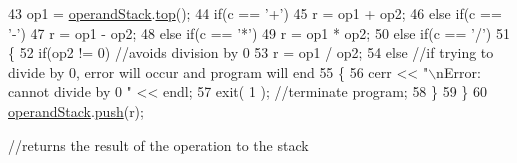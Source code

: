 \begin{DoxyCode}
{          }
43                op1 = \hyperlink{classAlgebraicExpression_a8f0ee1ac59e782a546a7de47e507b391}{operandStack}.\hyperlink{classStack_ad461f6de40c8672dbf743068f4515061}{top}();
44                \textcolor{keywordflow}{if}(c == \textcolor{charliteral}{'+'})
45                   r = op1 + op2;
46                \textcolor{keywordflow}{else} \textcolor{keywordflow}{if}(c == \textcolor{charliteral}{'-'})
47                   r = op1 - op2;
48                \textcolor{keywordflow}{else} \textcolor{keywordflow}{if}(c == \textcolor{charliteral}{'*'})
49                   r = op1 * op2;
50                \textcolor{keywordflow}{else} \textcolor{keywordflow}{if}(c == \textcolor{charliteral}{'/'})
51                \{
52                   \textcolor{keywordflow}{if}(op2 != 0) \textcolor{comment}{//avoids division by 0                                                      
                                                                                                       }
53                      r = op1 / op2;
54                   \textcolor{keywordflow}{else} \textcolor{comment}{//if trying to divide by 0, error will occur and program will end                   
                                                                                                       }
55                   \{
56                      cerr << \textcolor{stringliteral}{"\(\backslash\)nError: cannot divide by 0 "} << endl;
57                      exit( 1 ); \textcolor{comment}{//terminate program;                                                       
                                                                                                       }
58                   \}
59                \}
60               \hyperlink{classAlgebraicExpression_a8f0ee1ac59e782a546a7de47e507b391}{operandStack}.\hyperlink{classStack_a3553a0aa2c9640c5266e4d8790863e2e}{push}(r); \textcolor{comment}{//returns the result of the operation to the stack     
                                                                                                                  
}
\end{DoxyCode}

